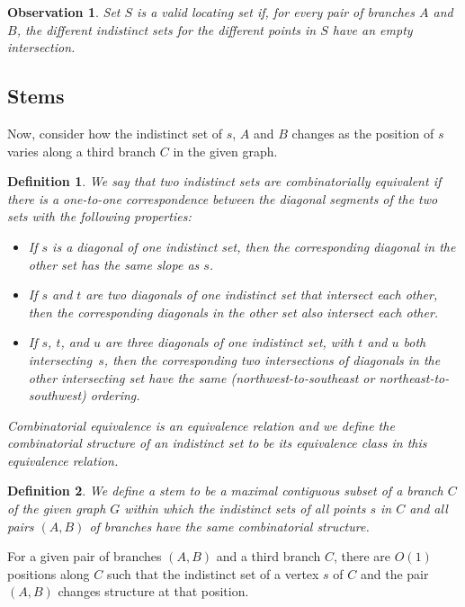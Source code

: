 \documentclass{jgaa-art}
\newtheorem{definition}{Definition}
\newtheorem{observation}{Observation}
\begin{document}
\begin{observation}
Set $S$ is a valid locating set if, for every pair of branches $A$ and $B$, the different indistinct sets for the different points in $S$ have an empty intersection.
\end{observation}

\subsection{Stems}
Now, consider how the indistinct set of $s$, $A$ and $B$  changes as the position of $s$ varies along a third branch $C$ in the given graph.

\begin{definition}
We say that two indistinct sets are \emph{combinatorially equivalent} if there is a one-to-one correspondence between the diagonal segments of the two sets with the following properties:
\begin{itemize}
\item If $s$ is a diagonal of one indistinct set, then the corresponding diagonal in the other set has the same slope as $s$.
\item If $s$ and $t$ are two diagonals of one indistinct set that intersect each other, then the corresponding diagonals in the other set also intersect each other.
\item If $s$, $t$, and $u$ are three diagonals of one indistinct set, with $t$ and $u$ both intersecting~$s$, then the corresponding two intersections of diagonals in the other intersecting set have the same (northwest-to-southeast or northeast-to-southwest) ordering.
\end{itemize}
Combinatorial equivalence is an equivalence relation and we define the \emph{combinatorial structure} of an indistinct set to be its equivalence class in this equivalence relation.
\end{definition}

\begin{definition}
We define a \emph{stem} to be a maximal contiguous subset of a branch $C$ of the given graph $G$ within which the indistinct sets of all points $s$ in $C$ and all pairs $(A,B)$ of branches have the same combinatorial structure.
\end{definition}

\begin{lemma}
\label{lem:const-breaks}
For a given pair of branches $(A,B)$ and a third branch $C$, there are $O(1)$ positions along $C$ such that the indistinct set of a vertex $s$ of $C$ and the pair $(A,B)$ changes structure at that position.
\end{lemma}
\end{document}
